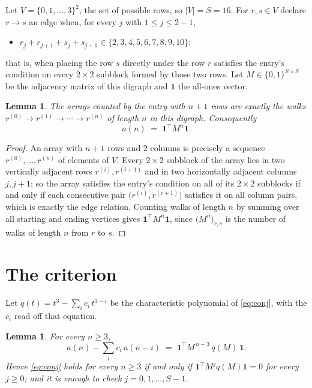 \documentclass[11pt,a4paper]{article}
\theoremstyle{plain}
\newtheorem{lemma}[theorem]{Lemma}
\theoremstyle{definition}
\begin{document}
Let $V=\{0,1,\dots,3\}^{2}$, the set of possible rows, so $|V|=S=16$. For
$r,s\in V$ declare $r\to s$ an edge when, for every $j$ with $1\le j\le 2-1$,
\begin{itemize}
\item $r_j+r_{j+1}+s_j+s_{j+1}\in\{2, 3, 4, 5, 6, 7, 8, 9, 10\}$;

\end{itemize}
that is, when placing the row $s$ directly under the row $r$ satisfies the entry's
condition on every $2\times2$ subblock formed by those two rows. Let $M\in\{0,1\}^{S\times
S}$ be the adjacency matrix of this digraph and $\mathbf{1}$ the all-ones vector.

\begin{lemma}\label{lem:walk}
The arrays counted by the entry with $n+1$ rows are exactly the walks
$r^{(0)}\to r^{(1)}\to\cdots\to r^{(n)}$ of length $n$ in this digraph. Consequently
\[
a(n)\;=\;\mathbf{1}^{\!\top}M^{n}\mathbf{1} .
\]
\end{lemma}

\begin{proof}
An array with $n+1$ rows and $2$ columns is precisely a sequence
$r^{(0)},\dots,r^{(n)}$ of elements of $V$. Every $2\times2$ subblock of the array lies
in two vertically adjacent rows $r^{(i)},r^{(i+1)}$ and in two horizontally adjacent
columns $j,j+1$; so the array satisfies the entry's condition on all of its $2\times2$
subblocks if and only if each consecutive pair $\bigl(r^{(i)},r^{(i+1)}\bigr)$ satisfies
it on all column pairs, which is exactly the edge relation. Counting walks of length $n$ by
summing over all starting and ending vertices gives
$\mathbf{1}^{\!\top}M^{n}\mathbf{1}$, since
$\bigl(M^{n}\bigr)_{r,s}$ is the number of walks of length $n$ from $r$ to $s$.
\end{proof}

\section{The criterion}

Let $q(t)=t^{3}-\sum_{i}c_i\,t^{3-i}$ be the characteristic polynomial of
\eqref{eq:conj}, with the $c_i$ read off that equation.

\begin{lemma}\label{lem:crit}
For every $n\ge3$,
\[
a(n)-\sum_i c_i\,a(n-i)\;=\;\mathbf{1}^{\!\top}M^{\,n-3}\,q(M)\,\mathbf{1} .
\]
Hence \eqref{eq:conj} holds for every $n\ge3$ if and only if
$\mathbf{1}^{\!\top}M^{j}q(M)\mathbf{1}=0$ for every $j\ge0$; and it is enough to
check $j=0,1,\dots,S-1$.
\end{lemma}
\end{document}

